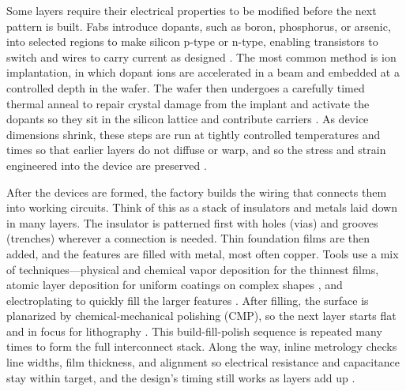 Some layers require their electrical properties to be modified before the next pattern is built. Fabs introduce dopants, such as boron, phosphorus, or arsenic, into selected regions to make silicon p-type or n-type, enabling transistors to switch and wires to carry current as designed \parencite{sze_physics_2007}. The most common method is ion implantation, in which dopant ions are accelerated in a beam and embedded at a controlled depth in the wafer. The wafer then undergoes a carefully timed thermal anneal to repair crystal damage from the implant and activate the dopants so they sit in the silicon lattice and contribute carriers \parencite{nishi_handbook_2007}. As device dimensions shrink, these steps are run at tightly controlled temperatures and times so that earlier layers do not diffuse or warp, and so the stress and strain engineered into the device are preserved \parencite{sze_physics_2007,irds_factory_integration_technical_working_group_international_2023}.

After the devices are formed, the factory builds the wiring that connects them into working circuits. Think of this as a stack of insulators and metals laid down in many layers. The insulator is patterned first with holes (vias) and grooves (trenches) wherever a connection is needed. Thin foundation films are then added, and the features are filled with metal, most often copper. Tools use a mix of techniques---physical and chemical vapor deposition for the thinnest films, atomic layer deposition for uniform coatings on complex shapes \parencite{puurunen_surface_2005}, and electroplating to quickly fill the larger features \parencite{nishi_handbook_2007,seshan_handbook_2018}. After filling, the surface is planarized by chemical-mechanical polishing (CMP), so the next layer starts flat and in focus for lithography \parencite{van_zant_microchip_2014,may_fundamentals_2006}. This build-fill-polish sequence is repeated many times to form the full interconnect stack. Along the way, inline metrology checks line widths, film thickness, and alignment so electrical resistance and capacitance stay within target, and the design's timing still works as layers add up \parencite{irds_metrology_technical_working_group_international_2023,irds_factory_integration_technical_working_group_international_2023}.

